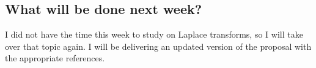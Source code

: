 \documentclass[12pt]{article}
\begin{document}
	\subsection*{What will be done next week?}
	I did not have the time this week to study on Laplace transforms, so I will take over that topic again. I will be delivering an updated version of the proposal with the appropriate references.
	
	\printbibliography %
\end{document}
